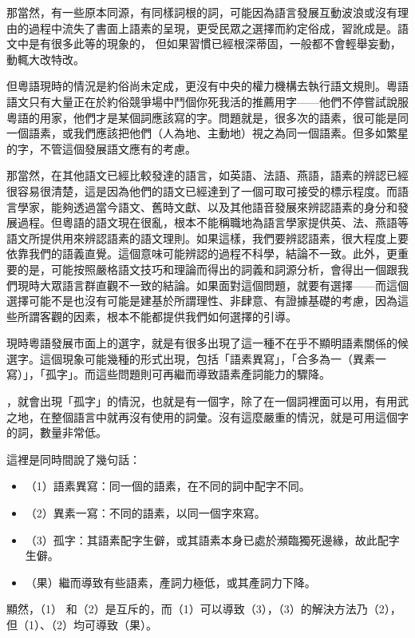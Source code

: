 \documentclass[a5paper, 12pt, openany]{book} %
\begin{document}
那當然，有一些原本同源，有同樣詞根的詞，可能因為語言發展互動波浪或沒有理由的過程中流失了書面上語素的呈現，更受民眾之選擇而約定俗成，習訛成是。語文中是有很多此等的現象的， 但如果習慣已經根深蒂固，一般都不會輕舉妄動，動輒大改特改。

但粵語現時的情況是約俗尚未定成，更沒有中央的權力機構去執行語文規則。粵語語文只有大量正在於約俗競爭場中鬥個你死我活的推薦用字——他們不停嘗試說服粵語的用家，他們才是某個詞應該寫的字。問題就是，很多次的語素，很可能是同一個語素，或我們應該把他們（人為地、主動地）視之為同一個語素。但多如繁星的字，不管這個發展語文應有的考慮。

那當然，在其他語文已經比較發達的語言，如英語、法語、燕語，語素的辨認已經很容易很清楚，這是因為他們的語文已經達到了一個可取可接受的標示程度。而語言學家，能夠透過當今語文、舊時文獻、以及其他語音發展來辨認語素的身分和發展過程。但粵語的語文現在很亂，根本不能稱職地為語言學家提供英、法、燕語等語文所提供用來辨認語素的語文理則。如果這樣，我們要辨認語素，很大程度上要依靠我們的語義直覺。這個意味可能辨認的過程不科學，結論不一致。此外，更重要的是，可能按照嚴格語文技巧和理論而得出的詞義和詞源分析，會得出一個跟我們現時大眾語言群直觀不一致的結論。如果面對這個問題，就要有選擇——而這個選擇可能不是也沒有可能是建基於所謂理性、非肆意、有證據基礎的考慮，因為這些所謂客觀的因素，根本不能都提供我們如何選擇的引導。 

現時粵語發展市面上的選字，就是有很多出現了這一種不在乎不顯明語素關係的候選字。這個現象可能幾種的形式出現，包括「語素異寫」，「合多為一（異素一寫）」，「孤字」。而這些問題則可再繼而導致語素產詞能力的驟降。

，就會出現「孤字」的情況，也就是有一個字，除了在一個詞裡面可以用，有用武之地，在整個語言中就再沒有使用的詞彙。沒有這麼嚴重的情況，就是可用這個字的詞，數量非常低。

這裡是同時間說了幾句話：

\begin{itemize}
\item[]（1）語素異寫：同一個的語素，在不同的詞中配字不同。
\item[]（2）異素一寫：不同的語素，以同一個字來寫。
\item[]（3）孤字：其語素配字生僻，或其語素本身已處於瀕臨獨死邊緣，故此配字生僻。
\item[]（果）繼而導致有些語素，產詞力極低，或其產詞力下降。
\end{itemize}


顯然，（1） 和（2）是互斥的，而（1）可以導致（3），（3）的解決方法乃（2），但（1）、（2）均可導致（果）。
\end{document}
